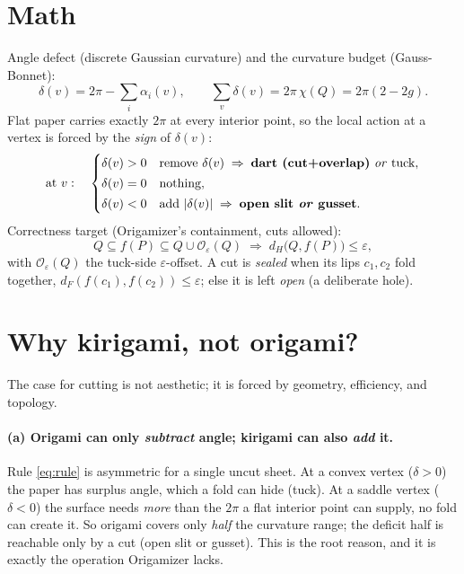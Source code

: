 \documentclass[11pt]{article}
\newcommand{\eps}{\varepsilon}
\newcommand{\defect}{\delta}
\newcommand{\Off}{\mathcal{O}_{\eps}}
\begin{document}
\section{Math}
Angle defect (discrete Gaussian curvature) and the curvature budget
(Gauss-Bonnet):
\begin{equation}
\defect(v)=2\pi-\sum_i\alpha_i(v),
\qquad
\sum_{v}\defect(v)=2\pi\,\chi(Q)=2\pi(2-2g).
\label{eq:gb}
\end{equation}
Flat paper carries exactly $2\pi$ at every interior point, so the local
action at a vertex is forced by the \emph{sign} of $\defect(v)$:
\begin{equation}
\text{at } v:\quad
\begin{cases}
\defect(v)>0 & \text{remove } \defect(v) \;\Rightarrow\; \textbf{dart (cut+overlap)} \text{ \emph{or} tuck},\\[2pt]
\defect(v)=0 & \text{nothing},\\[2pt]
\defect(v)<0 & \text{add } |\defect(v)| \;\Rightarrow\; \textbf{open slit \emph{or} gusset}.
\end{cases}
\label{eq:rule}
\end{equation}
Correctness target (Origamizer's containment, cuts allowed):
\begin{equation}
Q\subseteq f(P)\subseteq Q\cup\Off(Q)
\;\Longrightarrow\;
d_H\!\big(Q,f(P)\big)\le\eps,
\label{eq:target}
\end{equation}
with $\Off(Q)$ the tuck-side $\eps$-offset. A cut is \emph{sealed} when its
lips $c_1,c_2$ fold together, $d_F(f(c_1),f(c_2))\le\eps$; else it is left
\emph{open} (a deliberate hole).

\section{Why kirigami, not origami?}\label{sec:why}
The case for cutting is not aesthetic; it is forced by geometry, efficiency,
and topology.

\paragraph{(a) Origami can only \emph{subtract} angle; kirigami can also
\emph{add} it.} Rule \eqref{eq:rule} is asymmetric for a single uncut
sheet. At a convex vertex ($\defect>0$) the paper has surplus angle, which a
fold can hide (tuck). At a saddle vertex ($\defect<0$) the surface needs
\emph{more} than the $2\pi$ a flat interior point can supply, no fold can
create it. So origami covers only \emph{half} the curvature range; the
deficit half is reachable only by a cut (open slit or gusset). This is the
root reason, and it is exactly the operation Origamizer lacks.
\end{document}
